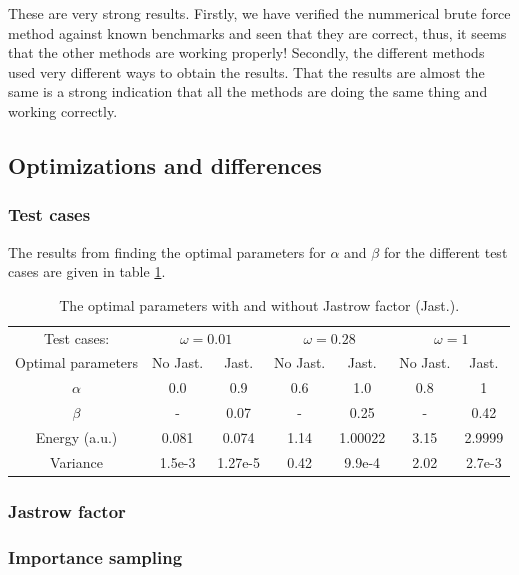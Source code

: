 These are very strong results. 
Firstly, we have verified the nummerical brute force method against known benchmarks and seen that they are correct,
thus, it seems that the other methods are working properly!
Secondly, the different methods used very different ways to obtain the results. 
That the results are almost the same is a strong indication that all the methods are doing the same thing and working correctly. 

\subsection{Optimizations and differences} \label{sec:res_opt_and_diff}

\subsubsection{Test cases}

The results from finding the optimal parameters for $\alpha$ and $\beta$ for the different test cases are given in table \ref{tab:test_cases}.

\begin{table}[h!]
	\centering 
	\begin{tabular}{c  c c  c  c  c  c }
	\toprule
	 Test cases: 			& \multicolumn{2}{c}{$\omega=0.01$} & \multicolumn{2}{c}{$\omega=0.28$} & \multicolumn{2}{c}{$\omega=1$} \\
	 Optimal parameters  	& No Jast. & 	Jast. & No Jast. & 	Jast. & No Jast. & Jast. \\
	 \midrule
	 $\alpha$& 	0.0 & 	0.9 & 	0.6 & 	1.0 	& 0.8	& 1\\
	 $\beta$ & 	- & 	0.07 & 	- & 	0.25 & -  & 0.42\\
	 \midrule
	 Energy (a.u.) & 				0.081 &		0.074 &	 1.14  &	1.00022 & 3.15 & 2.9999 \\
	 Variance & 					1.5e-3 &	1.27e-5	 & 0.42 &	 9.9e-4 & 2.02 & 2.7e-3 \\
	 \bottomrule
	\end{tabular}
	\caption{The optimal parameters with and without Jastrow factor (Jast.).}
	\label{tab:test_cases}
\end{table}

\subsubsection{Jastrow factor}

\subsubsection{Importance sampling}

